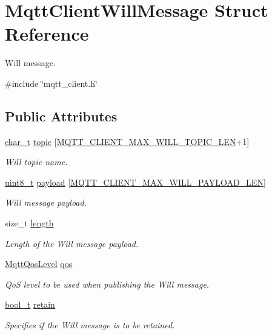 \hypertarget{structMqttClientWillMessage}{}\section{Mqtt\+Client\+Will\+Message Struct Reference}
\label{structMqttClientWillMessage}


Will message.  




{\ttfamily \#include \char`\"{}mqtt\+\_\+client.\+h\char`\"{}}

\subsection*{Public Attributes}
\begin{DoxyCompactItemize}
\item 
\hyperlink{compiler__port_8h_a40bb5262bf908c328fbcfbe5d29d0201}{char\+\_\+t} \hyperlink{structMqttClientWillMessage_ab15e9ab89804063a8f96bfef47861bcd}{topic} \mbox{[}\hyperlink{mqtt__client_8h_ac413355c9b321681ee436457ed50d6c9}{M\+Q\+T\+T\+\_\+\+C\+L\+I\+E\+N\+T\+\_\+\+M\+A\+X\+\_\+\+W\+I\+L\+L\+\_\+\+T\+O\+P\+I\+C\+\_\+\+L\+EN}+1\mbox{]}
\begin{DoxyCompactList}\small\item\em Will topic name. \end{DoxyCompactList}\item 
\hyperlink{stdint_8h_aba7bc1797add20fe3efdf37ced1182c5}{uint8\+\_\+t} \hyperlink{structMqttClientWillMessage_a5c019bc3159b7c7cb82382cd66ae8180}{payload} \mbox{[}\hyperlink{mqtt__client_8h_a8f48f7302dbdeac54148f3b274706806}{M\+Q\+T\+T\+\_\+\+C\+L\+I\+E\+N\+T\+\_\+\+M\+A\+X\+\_\+\+W\+I\+L\+L\+\_\+\+P\+A\+Y\+L\+O\+A\+D\+\_\+\+L\+EN}\mbox{]}
\begin{DoxyCompactList}\small\item\em Will message payload. \end{DoxyCompactList}\item 
size\+\_\+t \hyperlink{structMqttClientWillMessage_a9a77e5a108a85c2242f7d9f5333cde34}{length}
\begin{DoxyCompactList}\small\item\em Length of the Will message payload. \end{DoxyCompactList}\item 
\hyperlink{mqtt__common_8h_a79ec1e304b7f2ed51b12f489f642f0bb}{Mqtt\+Qos\+Level} \hyperlink{structMqttClientWillMessage_acd54a5da3775c6207a49abf737782cf3}{qos}
\begin{DoxyCompactList}\small\item\em QoS level to be used when publishing the Will message. \end{DoxyCompactList}\item 
\hyperlink{compiler__port_8h_a812d16e5494522586b3784e55d479912}{bool\+\_\+t} \hyperlink{structMqttClientWillMessage_a3f803c4c50217dc7205ca4e95c9303f7}{retain}
\begin{DoxyCompactList}\small\item\em Specifies if the Will message is to be retained. \end{DoxyCompactList}\end{DoxyCompactItemize}


